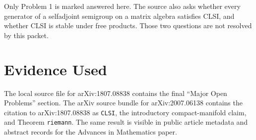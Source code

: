 \documentclass[11pt]{article}
\begin{document}
Only Problem 1 is marked answered here.  The source also asks whether
every generator of a selfadjoint semigroup on a matrix algebra satisfies
CLSI, and whether CLSI is stable under free products.  Those two
questions are not resolved by this packet.

\section*{Evidence Used}

The local source file for arXiv:1807.08838 contains the final ``Major
Open Problems'' section.  The arXiv source bundle for arXiv:2007.06138
contains the citation to arXiv:1807.08838 as \texttt{CLSI}, the
introductory compact-manifold claim, and Theorem \texttt{riemann}.
The same result is visible in public article metadata and abstract
records for the Advances in Mathematics paper.
\end{document}
